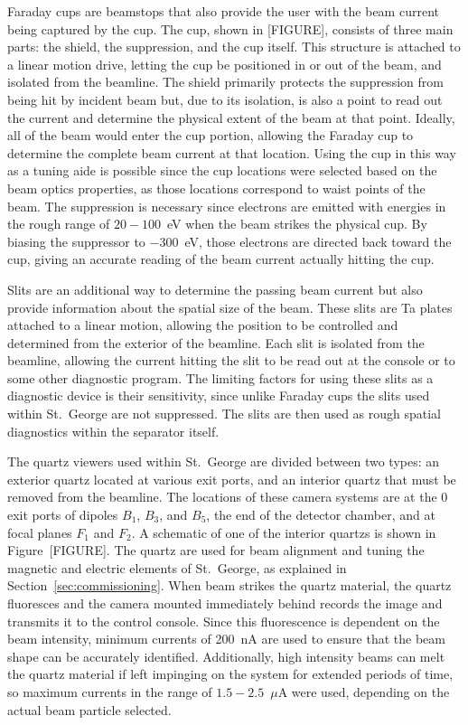 Faraday cups are beamstops that also provide the user with the beam current
being captured by the cup. The cup, shown in [FIGURE], consists of three main
parts: the shield, the suppression, and the cup itself. This structure is
attached to a linear motion drive, letting the cup be positioned in or out of
the beam, and isolated from the beamline. The shield primarily protects the
suppression from being hit by incident beam but, due to its isolation, is also
a point to read out the current and determine the physical extent of the beam
at that point. Ideally, all of the beam would enter the cup portion, allowing
the Faraday cup to determine the complete beam current at that location. Using
the cup in this way as a tuning aide is possible since the cup locations were
selected based on the beam optics properties, as those locations
correspond to waist points of the beam. The suppression is necessary since
electrons are emitted with energies in the rough range of $20-100$~eV
when the beam strikes the physical cup. By biasing the suppressor to $-300$~eV,
those electrons are directed back toward the cup, giving an accurate reading of
the beam current actually hitting the cup.

Slits are an additional way to determine the passing beam current but also
provide information about the spatial size of the beam. These slits are Ta
plates attached to a linear motion, allowing the position to be controlled and
determined from the exterior of the beamline. Each slit is isolated from the
beamline, allowing the current hitting the slit to be read out at the console
or to some other diagnostic program. The limiting factors for using these slits
as a diagnostic device is their sensitivity, since unlike Faraday cups the
slits used within St.\ George are not suppressed. The slits are then used as
rough spatial diagnostics within the separator itself.

The quartz viewers used within St.\ George are divided between two types: an
exterior quartz located at various exit ports, and an interior quartz that must
be removed from the beamline. The locations of these camera systems are at the
0\degree{} exit ports of dipoles $B_1$, $B_3$, and $B_5$, the end of the
detector chamber, and at focal planes $F_1$ and $F_2$. A schematic of one of
the interior quartzs is shown in Figure~[FIGURE]. The quartz are used for beam
alignment and tuning the magnetic and electric elements of St.\ George, as
explained in Section~\ref{sec:commissioning}. When beam strikes the quartz
material, the quartz fluoresces and the camera mounted immediately behind
records the image and transmits it to the control console. Since this
fluorescence is dependent on the beam intensity, minimum currents of 200~nA are
used to ensure that the beam shape can be accurately identified. Additionally,
high intensity beams can melt the quartz material if left impinging on the
system for extended periods of time, so maximum currents in the range of
$1.5-2.5$~$\mu$A were used, depending on the actual beam particle selected.


